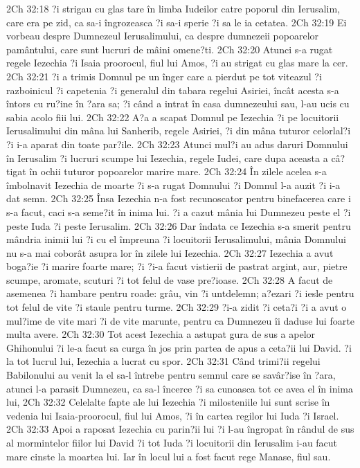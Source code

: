 2Ch 32:18  ?i strigau cu glas tare în limba Iudeilor catre poporul din Ierusalim, care era pe zid, ca sa-i îngrozeasca ?i sa-i sperie ?i sa le ia cetatea.
2Ch 32:19  Ei vorbeau despre Dumnezeul Ierusalimului, ca despre dumnezeii popoarelor pamântului, care sunt lucruri de mâini omene?ti.
2Ch 32:20  Atunci s-a rugat regele Iezechia ?i Isaia proorocul, fiul lui Amos, ?i au strigat cu glas mare la cer.
2Ch 32:21  ?i a trimis Domnul pe un înger care a pierdut pe tot viteazul ?i razboinicul ?i capetenia ?i generalul din tabara regelui Asiriei, încât acesta s-a întors cu ru?ine în ?ara sa; ?i când a intrat în casa dumnezeului sau, l-au ucis cu sabia acolo fiii lui.
2Ch 32:22  A?a a scapat Domnul pe Iezechia ?i pe locuitorii Ierusalimului din mâna lui Sanherib, regele Asiriei, ?i din mâna tuturor celorlal?i ?i i-a aparat din toate par?ile.
2Ch 32:23  Atunci mul?i au adus daruri Domnului în Ierusalim ?i lucruri scumpe lui Iezechia, regele Iudei, care dupa aceasta a câ?tigat în ochii tuturor popoarelor marire mare.
2Ch 32:24  În zilele acelea s-a îmbolnavit Iezechia de moarte ?i s-a rugat Domnului ?i Domnul l-a auzit ?i i-a dat semn.
2Ch 32:25  Însa Iezechia n-a fost recunoscator pentru binefacerea care i s-a facut, caci s-a seme?it în inima lui. ?i a cazut mânia lui Dumnezeu peste el ?i peste Iuda ?i peste Ierusalim.
2Ch 32:26  Dar îndata ce Iezechia s-a smerit pentru mândria inimii lui ?i cu el împreuna ?i locuitorii Ierusalimului, mânia Domnului nu s-a mai coborât asupra lor în zilele lui Iezechia.
2Ch 32:27  Iezechia a avut boga?ie ?i marire foarte mare; ?i ?i-a facut vistierii de pastrat argint, aur, pietre scumpe, aromate, scuturi ?i tot felul de vase pre?ioase.
2Ch 32:28  A facut de asemenea ?i hambare pentru roade: grâu, vin ?i untdelemn; a?ezari ?i iesle pentru tot felul de vite ?i staule pentru turme.
2Ch 32:29  ?i-a zidit ?i ceta?i ?i a avut o mul?ime de vite mari ?i de vite marunte, pentru ca Dumnezeu îi daduse lui foarte multa avere.
2Ch 32:30  Tot acest Iezechia a astupat gura de sus a apelor Ghihonului ?i le-a facut sa curga în jos prin partea de apus a ceta?ii lui David. ?i la tot lucrul lui, Iezechia a lucrat cu spor.
2Ch 32:31  Când trimi?ii regelui Babilonului au venit la el sa-l întrebe pentru semnul care se savâr?ise în ?ara, atunci l-a parasit Dumnezeu, ca sa-l încerce ?i sa cunoasca tot ce avea el în inima lui,
2Ch 32:32  Celelalte fapte ale lui Iezechia ?i milosteniile lui sunt scrise în vedenia lui Isaia-proorocul, fiul lui Amos, ?i în cartea regilor lui Iuda ?i Israel.
2Ch 32:33  Apoi a raposat Iezechia cu parin?ii lui ?i l-au îngropat în rândul de sus al mormintelor fiilor lui David ?i tot Iuda ?i locuitorii din Ierusalim i-au facut mare cinste la moartea lui. Iar în locul lui a fost facut rege Manase, fiul sau.
